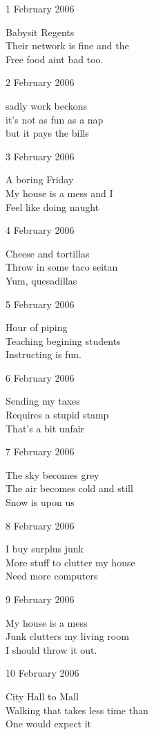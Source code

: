 \documentclass[12pt]{article}
\begin{document}
\setlength{\parskip}{1mm}

\newpage

1 February 2006    

Babysit Regents \\
Their network is fine and the \\
Free food aint bad too.

2 February 2006

sadly work beckons \\
it's not as fun as a nap \\
but it pays the bills

3 February 2006

A boring Friday \\
My house is a mess and I \\
Feel like doing naught

4 February 2006

Cheese and tortillas \\
Throw in some taco seitan \\
Yum, quesadillas

5 February 2006

Hour of piping \\
Teaching begining students \\
Instructing is fun.

6 February 2006

Sending my taxes \\
Requires a stupid stamp \\
That's a bit unfair


\newpage

7 February 2006

The sky becomes grey \\
The air becomes cold and still \\
Snow is upon us

8 February 2006

I buy surplus junk \\
More stuff to clutter my house \\
Need more computers

9 February 2006

My house is a mess \\
Junk clutters my living room \\
I should throw it out.

10 February 2006

City Hall to Mall \\
Walking that takes less time than \\
One would expect it
\end{document}
